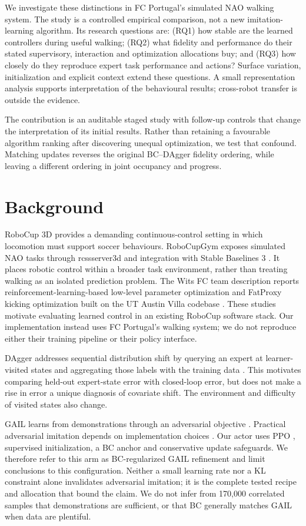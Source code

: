 \documentclass[conference]{IEEEtran}
\begin{document}
We investigate these distinctions in FC Portugal's simulated NAO walking system. The study is a controlled empirical comparison, not a new imitation-learning algorithm. Its research questions are: (RQ1) how stable are the learned controllers during useful walking; (RQ2) what fidelity and performance do their stated supervisory, interaction and optimization allocations buy; and (RQ3) how closely do they reproduce expert task performance and actions? Surface variation, initialization and explicit context extend these questions. A small representation analysis supports interpretation of the behavioural results; cross-robot transfer is outside the evidence.

The contribution is an auditable staged study with follow-up controls that change the interpretation of its initial results. Rather than retaining a favourable algorithm ranking after discovering unequal optimization, we test that confound. Matching updates reverses the original BC--DAgger fidelity ordering, while leaving a different ordering in joint occupancy and progress.

\section{Background}

RoboCup 3D provides a demanding continuous-control setting in which locomotion must support soccer behaviours. RoboCupGym exposes simulated NAO tasks through rcssserver3d and integration with Stable Baselines 3 \citep{beukman2024}. It places robotic control within a broader task environment, rather than treating walking as an isolated prediction problem. The Wits FC team description reports reinforcement-learning-based low-level parameter optimization and FatProxy kicking optimization built on the UT Austin Villa codebase \citep{ingram2023}. These studies motivate evaluating learned control in an existing RoboCup software stack. Our implementation instead uses FC Portugal's walking system; we do not reproduce either their training pipeline or their policy interface.

DAgger addresses sequential distribution shift by querying an expert at learner-visited states and aggregating those labels with the training data \citep{ross2011}. This motivates comparing held-out expert-state error with closed-loop error, but does not make a rise in error a unique diagnosis of covariate shift. The environment and difficulty of visited states also change.

GAIL learns from demonstrations through an adversarial objective \citep{ho2016}. Practical adversarial imitation depends on implementation choices \citep{orsini2021}. Our actor uses PPO \citep{schulman2017}, supervised initialization, a BC anchor and conservative update safeguards. We therefore refer to this arm as BC-regularized GAIL refinement and limit conclusions to this configuration. Neither a small learning rate nor a KL constraint alone invalidates adversarial imitation; it is the complete tested recipe and allocation that bound the claim. We do not infer from 170,000 correlated samples that demonstrations are sufficient, or that BC generally matches GAIL when data are plentiful.
\end{document}

